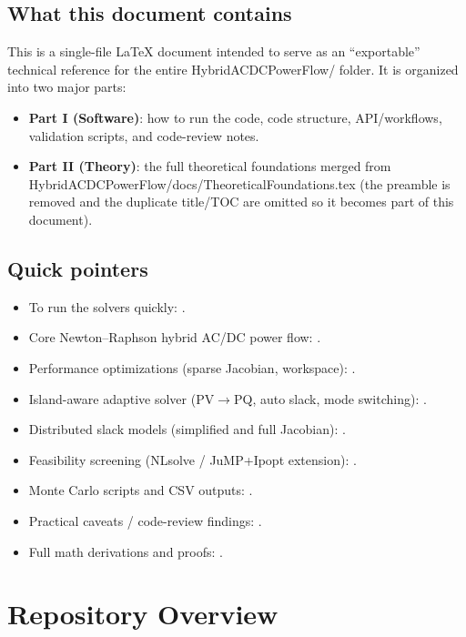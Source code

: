 \documentclass[11pt]{article}
\def\file#1{#1}%
\newcommand{\file}[1]{\path{#1}}
\begin{document}
\subsection{What this document contains}
This is a single-file \LaTeX{} document intended to serve as an ``exportable'' technical reference for the entire \file{HybridACDCPowerFlow/} folder.
It is organized into two major parts:
\begin{itemize}[leftmargin=*]
  \item \textbf{Part I (Software)}: how to run the code, code structure, API/workflows, validation scripts, and code-review notes.
  \item \textbf{Part II (Theory)}: the full theoretical foundations merged from \file{HybridACDCPowerFlow/docs/TheoreticalFoundations.tex} (the preamble is removed and the duplicate title/TOC are omitted so it becomes part of this document).
\end{itemize}

\subsection{Quick pointers}
\begin{itemize}[leftmargin=*]
  \item To run the solvers quickly: .
  \item Core Newton--Raphson hybrid AC/DC power flow: .
  \item Performance optimizations (sparse Jacobian, workspace): .
  \item Island-aware adaptive solver (PV$\rightarrow$PQ, auto slack, mode switching): .
  \item Distributed slack models (simplified and full Jacobian): .
  \item Feasibility screening (NLsolve / JuMP+Ipopt extension): .
  \item Monte Carlo scripts and CSV outputs: .
  \item Practical caveats / code-review findings: .
  \item Full math derivations and proofs: .
\end{itemize}

\section{Repository Overview}\label{sec:repo-overview}
\end{document}
